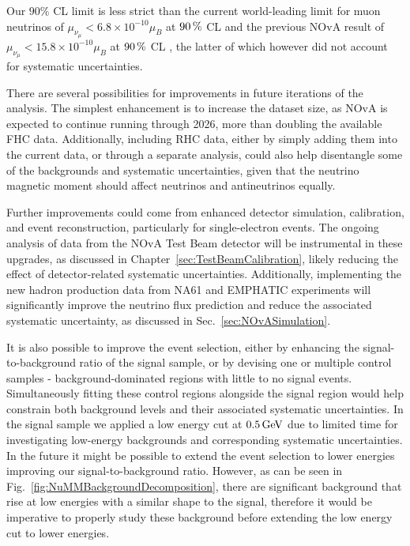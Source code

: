 Our $90\%$ \gls{CL} limit is less strict than the current world-leading \cite{PDG.pdf} limit for muon neutrinos of $\mu_{\nu_\mu}<6.8\times 10^{-10}\mu_B$  at $\unit[90]{\%}$ \gls{CL} \cite{LSNDLimits2001.pdf} and the previous \gls{NOvA} result of $\mu_{\nu_\mu}<15.8\times 10^{-10}\mu_B$ at $\unit[90]{\%}$ \gls{CL} \cite{nuMM-thesis-biaow.pdf}, the latter of which however did not account for systematic uncertainties.

There are several possibilities for improvements in future iterations of the analysis. The simplest enhancement is to increase the dataset size, as \gls{NOvA} is expected to continue running through 2026, more than doubling the available \gls{FHC} data. Additionally, including \gls{RHC} data, either by simply adding them into the current data, or through a separate analysis, could also help disentangle some of the backgrounds and systematic uncertainties, given that the neutrino magnetic moment should affect neutrinos and antineutrinos equally.

Further improvements could come from enhanced detector simulation, calibration, and event reconstruction, particularly for single-electron events. The ongoing analysis of data from the \gls{NOvA} Test Beam detector will be instrumental in these upgrades, as discussed in Chapter~\ref{sec:TestBeamCalibration}, likely reducing the effect of detector-related systematic uncertainties. Additionally, implementing the new hadron production data from NA61 and EMPHATIC experiments will significantly improve the neutrino flux prediction and reduce the associated systematic uncertainty, as discussed in Sec.~\ref{sec:NOvASimulation}.

It is also possible to improve the event selection, either by enhancing the signal-to-background ratio of the signal sample, or by devising one or multiple control samples - background-dominated regions with little to no signal events. Simultaneously fitting these control regions alongside the signal region would help constrain both background levels and their associated systematic uncertainties. In the signal sample we applied a low energy cut at $\unit[0.5]{GeV}$ due to limited time for investigating low-energy backgrounds and corresponding systematic uncertainties. In the future it might be possible to extend the event selection to lower energies improving our signal-to-background ratio. However, as can be seen in Fig.~\ref{fig:NuMMBackgroundDecomposition}, there are significant background that rise at low energies with a similar shape to the signal, therefore it would be imperative to properly study these background before extending the low energy cut to lower energies.

